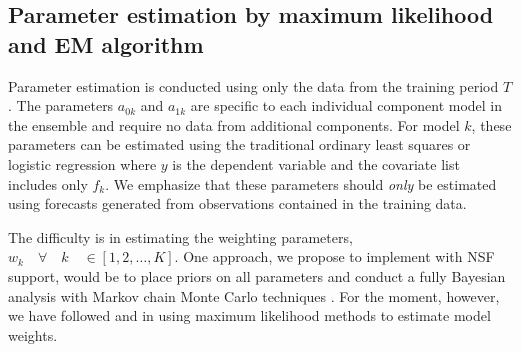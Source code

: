\documentclass[pdftex,12pt,fullpage,oneside]{amsart}
\begin{document}










\subsection{Parameter estimation by maximum likelihood and EM
algorithm}

Parameter estimation is conducted using only the data from the
training period $T$.  The parameters $a_{0k}$ and $a_{1k}$ are
specific to each individual component model in the ensemble and
require no data from additional components. For model $k$, these
parameters can be estimated using the traditional ordinary least
squares or logistic regression where $y$ is the dependent variable and
the covariate list includes only $f_k$.  We emphasize that these
parameters should \textit{only} be estimated using forecasts generated
from observations contained in the training data.

The difficulty is in estimating the weighting parameters, $w_k \quad \forall \quad k \quad \in [1, 2, \dots, K]$. One approach,  we propose to implement
with NSF support, would be to place priors on all parameters and conduct a
fully Bayesian analysis with Markov chain Monte Carlo techniques
\citep[c.f.][]{Vrugt:2008}.  For the moment, however, we have followed
\citet{Raftery:2005} and \citet{Sloughter:2007} in using maximum
likelihood methods to estimate model weights.
\end{document}
